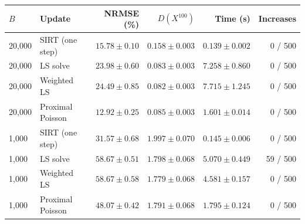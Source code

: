 \begin{tabular}{@{}llrrrr@{}}
\toprule
$B$ & Update & NRMSE (\%) & $D(X^{100})$ & Time (s) & Increases \\
\midrule
20,000 & SIRT (one step) & $15.78\pm0.10$ & $0.158\pm0.003$ & $0.139\pm0.002$ & 0 / 500 \\
20,000 & LS solve & $23.98\pm0.60$ & $0.083\pm0.003$ & $7.258\pm0.860$ & 0 / 500 \\
20,000 & Weighted LS & $24.49\pm0.85$ & $0.082\pm0.003$ & $7.715\pm1.245$ & 0 / 500 \\
20,000 & Proximal Poisson & $12.92\pm0.25$ & $0.085\pm0.003$ & $1.601\pm0.014$ & 0 / 500 \\
1,000 & SIRT (one step) & $31.57\pm0.68$ & $1.997\pm0.070$ & $0.145\pm0.006$ & 0 / 500 \\
1,000 & LS solve & $58.67\pm0.51$ & $1.798\pm0.068$ & $5.070\pm0.449$ & 59 / 500 \\
1,000 & Weighted LS & $58.67\pm0.58$ & $1.779\pm0.068$ & $4.581\pm0.157$ & 0 / 500 \\
1,000 & Proximal Poisson & $48.07\pm0.42$ & $1.791\pm0.068$ & $1.795\pm0.124$ & 0 / 500 \\
\bottomrule
\end{tabular}
